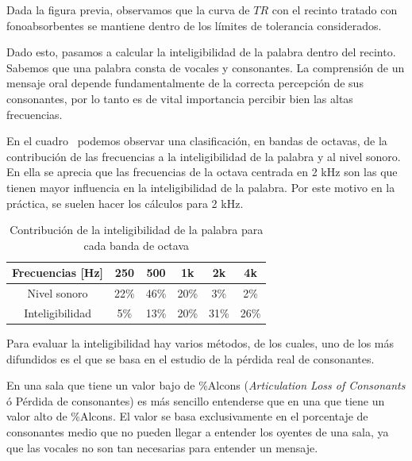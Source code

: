 \par Dada la figura previa, observamos que la curva de $TR$ con el recinto tratado con fonoabsorbentes se mantiene dentro de los límites de tolerancia considerados.

\par Dado esto, pasamos a calcular la inteligibilidad de la palabra dentro del recinto. Sabemos que una palabra consta de vocales y consonantes. La comprensión de un mensaje oral depende fundamentalmente de la correcta percepción de sus consonantes, por lo tanto es de vital importancia percibir bien las altas frecuencias.

\par En el cuadro~ podemos observar una clasificación, en bandas de octavas, de la contribución de las frecuencias a la inteligibilidad de la palabra y al nivel sonoro. En ella se aprecia que las frecuencias de la octava centrada en 2 kHz son las que tienen mayor influencia en la inteligibilidad de la palabra. Por este motivo en la práctica, se suelen hacer los cálculos para 2 kHz.

\begin{table}[h]
    \centering
    \begin{tabular}{|c|c|c|c|c|c|} \hline
        Frecuencias [Hz] & 250 & 500 & 1k & 2k & 4k  \\ \hline
        Nivel sonoro &22\%& 46\% & 20\% &3\% &2\% \\ \hline
        Inteligibilidad &5\% &13\% &20\% &31\% &26\% \\ \hline
    \end{tabular}
    \caption{Contribución de la inteligibilidad de la palabra para cada banda de octava}
    \label{tab:Contribucion_inteligibilidad_x_banda_de_octava}
\end{table}

\par Para evaluar la inteligibilidad hay varios métodos, de los cuales, uno de los más difundidos es el que se basa en el estudio de la pérdida real de consonantes.

\par En una sala que tiene un valor bajo de \%Alcons (\textit{Articulation Loss of Consonants} ó Pérdida de consonantes) es más sencillo entenderse que en una que tiene un valor alto de \%Alcons. El valor se basa exclusivamente en el porcentaje de consonantes medio que no pueden llegar a entender los oyentes de una sala, ya que las vocales no son tan necesarias para entender un mensaje.

